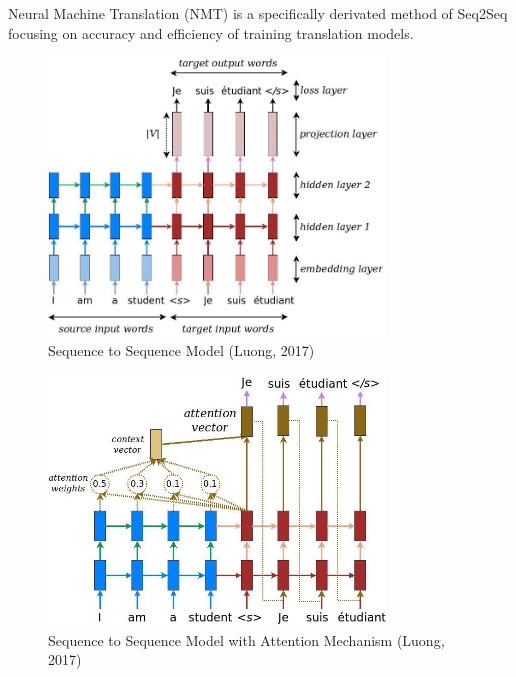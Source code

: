 \documentclass[10pt,a4paper]{report}
\begin{document}
Neural Machine Translation (NMT) is a specifically derivated method of Seq2Seq focusing on accuracy and efficiency of training translation models.
\clearpage
\begin{figure}
\begin{center}
\includegraphics[width=0.8\textwidth]{seq2seq.jpg}
\caption{Sequence to Sequence Model (Luong, 2017)}
\end{center}
\end{figure}
\begin{figure}
\begin{center}
\includegraphics[width=0.8\textwidth] {attention_mechanism.jpg}
\caption{Sequence to Sequence Model with Attention Mechanism (Luong, 2017)}
\end{center}
\end{figure}
\clearpage
\end{document}
